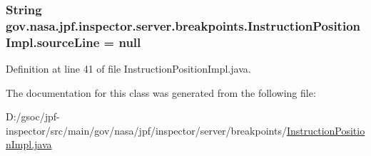 \subsubsection[{\texorpdfstring{source\+Line}{sourceLine}}]{\setlength{\rightskip}{0pt plus 5cm}String gov.\+nasa.\+jpf.\+inspector.\+server.\+breakpoints.\+Instruction\+Position\+Impl.\+source\+Line = null\hspace{0.3cm}{\ttfamily [private]}}\hypertarget{classgov_1_1nasa_1_1jpf_1_1inspector_1_1server_1_1breakpoints_1_1_instruction_position_impl_ae8a3786b40675ad5b90a137b828c539b}{}\label{classgov_1_1nasa_1_1jpf_1_1inspector_1_1server_1_1breakpoints_1_1_instruction_position_impl_ae8a3786b40675ad5b90a137b828c539b}


Definition at line 41 of file Instruction\+Position\+Impl.\+java.



The documentation for this class was generated from the following file\+:\begin{DoxyCompactItemize}
\item 
D\+:/gsoc/jpf-\/inspector/src/main/gov/nasa/jpf/inspector/server/breakpoints/\hyperlink{_instruction_position_impl_8java}{Instruction\+Position\+Impl.\+java}\end{DoxyCompactItemize}
